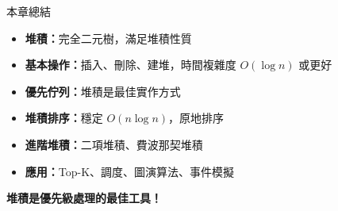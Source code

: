 \documentclass{beamer}
\begin{document}
\begin{frame}{本章總結}
\begin{itemize}
    \item \textbf{堆積：}完全二元樹，滿足堆積性質
    \item \textbf{基本操作：}插入、刪除、建堆，時間複雜度 $O(\log n)$ 或更好
    \item \textbf{優先佇列：}堆積是最佳實作方式
    \item \textbf{堆積排序：}穩定 $O(n \log n)$，原地排序
    \item \textbf{進階堆積：}二項堆積、費波那契堆積
    \item \textbf{應用：}Top-K、調度、圖演算法、事件模擬
\end{itemize}

\vspace{1em}
\begin{center}
    \textbf{堆積是優先級處理的最佳工具！}
\end{center}
\end{frame}
\end{document}
